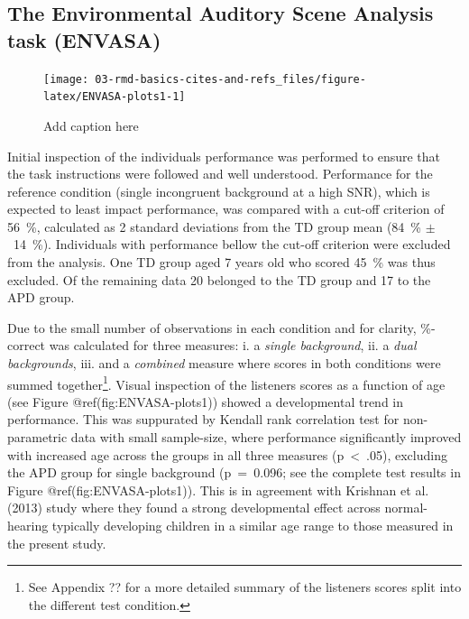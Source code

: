 \documentclass[a4paper,nobind]{templates/ociamthesis}
\begin{document}
\hypertarget{the-environmental-auditory-scene-analysis-task-envasa-1}{%
\subsection{The Environmental Auditory Scene Analysis task
(ENVASA)}\label{the-environmental-auditory-scene-analysis-task-envasa-1}}

\begin{figure}

{\centering \texttt{[image: 03-rmd-basics-cites-and-refs\_files/figure-latex/ENVASA-plots1-1]} 

}

\caption{Add caption here}\label{fig:ENVASA-plots1}
\end{figure}

Initial inspection of the individuals performance was performed to
ensure that the task instructions were followed and well understood.
Performance for the reference condition (single incongruent background
at a high SNR), which is expected to least impact performance, was
compared with a cut-off criterion of 56~\%, calculated as 2 standard
deviations from the TD group mean (84~\% \(\pm\)~14~\%). Individuals
with performance bellow the cut-off criterion were excluded from the
analysis. One TD group aged 7 years old who scored 45~\% was thus
excluded. Of the remaining data 20 belonged to the TD group and 17 to
the APD group.

Due to the small number of observations in each condition and for
clarity, \%-correct was calculated for three measures: i. a \emph{single
background}, ii. a \emph{dual backgrounds}, iii. and a \emph{combined}
measure where scores in both conditions were summed together\footnote{See
  Appendix ?? for a more detailed summary of the listeners scores split
  into the different test condition.}. Visual inspection of the
listeners scores as a function of age (see Figure
@ref(fig:ENVASA-plots1)) showed a developmental trend in performance.
This was suppurated by Kendall rank correlation test for non-parametric
data with small sample-size, where performance significantly improved
with increased age across the groups in all three measures
(p~\textless~.05), excluding the APD group for single background
(p~=~0.096; see the complete test results in Figure
@ref(fig:ENVASA-plots1)). This is in agreement with Krishnan et al.
(2013) study where they found a strong developmental effect across
normal-hearing typically developing children in a similar age range to
those measured in the present study.
\end{document}
